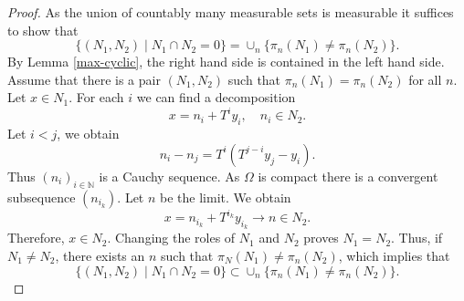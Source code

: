 \documentclass[12pt]{amsart}
\newcommand{\N}{\mathbb{N}}
\numberwithin{equation}{section}
\begin{document}
\begin{proof}
    As the union of countably many measurable sets is measurable it suffices to show that 
    \[\{(N_1,N_2)\mid N_1\cap N_2=0\}=\cup_n \{\pi_n(N_1)\neq \pi_n(N_2)\}.\]
By Lemma \ref{max-cyclic}, the right hand side is contained in the left hand side. Assume that there is a pair $(N_1,N_2)$ such that $\pi_n(N_1)= \pi_n(N_2)$ for all $n$. Let $x\in N_1$. For each $i$ we can find a decomposition
\[x=n_i+T^iy_i,\quad n_i\in N_2.\]
Let $i<j$, we obtain
\[n_i-n_j=T^i(T^{j-i}y_j-y_i). \]
Thus $(n_i)_{i\in \N}$ is a Cauchy sequence. As $\Omega$ is compact there is a convergent subsequence $(n_{i_k})$. Let $n$ be the limit. We obtain
\[x=n_{i_k}+T^{i_k}y_{i_k}\rightarrow n\in N_2.\]
Therefore, $x\in N_2$. Changing the roles of $N_1$ and $N_2$ proves $N_1=N_2$. Thus, if $N_1\neq N_2$, there exists an $n$ such that $\pi_N(N_1)\neq \pi_n(N_2)$, which implies that 
\[\{(N_1,N_2)\mid N_1\cap N_2=0\}\subset \cup_n \{\pi_n(N_1)\neq \pi_n(N_2)\}.\]


\end{proof}
\end{document}
